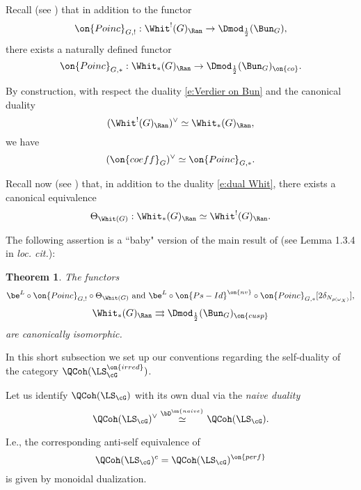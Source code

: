 \documentclass[9pt]{amsart}
\newtheorem{thm}[subsubsection]{Theorem}
\theoremstyle{remark}
\theoremstyle{definition}
\theoremstyle{remark}
\numberwithin{equation}{section}
\begin{document}
\sssec{}

Recall (see \cite[Sect. 9.5]{GLC2}) that in addition to the functor
$$\on{Poinc}_{G,!}:\Whit^!(G)_\Ran\to \Dmod_{\frac{1}{2}}(\Bun_G),$$
there exists a naturally defined functor
$$\on{Poinc}_{G,*}:\Whit_*(G)_\Ran\to \Dmod_{\frac{1}{2}}(\Bun_G)_{\on{co}}.$$

\sssec{}

By construction, with respect the duality \eqref{e:Verdier on Bun} and the canonical duality
\begin{equation} \label{e:dual Whit}
(\Whit^!(G)_\Ran)^\vee \simeq \Whit_*(G)_\Ran,
\end{equation}
we have
\begin{equation} \label{e:dual of Poinc}
(\on{coeff}_G)^\vee \simeq \on{Poinc}_{G,*}.
\end{equation} 

\sssec{}

Recall now (see \cite[Theorem 1.3.13]{GLC2}) that, in addition to the duality \eqref{e:dual Whit}, there exists a canonical
equivalence
\begin{equation} \label{e:Theta}
\Theta_{\Whit(G)}:\Whit_*(G)_\Ran\simeq \Whit^!(G)_\Ran.
\end{equation} 

\medskip

The following assertion is a ``baby" version of the main result of \cite{Lin} (see Lemma 1.3.4 in {\it loc. cit.}): 

\begin{thm} \label{t:simple Kevin}
The functors
$$\be^L\circ \on{Poinc}_{G,!}\circ \Theta_{\Whit(G)} \text{ and } \be^L\circ \on{Ps-Id}^{\on{nv}} \circ \on{Poinc}_{G,*}[2\delta_{N_{\rho(\omega_X)}}],$$
$$\Whit_*(G)_\Ran\rightrightarrows \Dmod_{\frac{1}{2}}(\Bun_G)_{\on{cusp}}$$
are canonically isomorphic.
\end{thm} 



In this short subsection we set up our conventions regarding the self-duality of the category $\QCoh(\LS^{\on{irred}}_\cG)$. 

\sssec{}

Let us identify $\QCoh(\LS_\cG)$ with its own dual via the \emph{naive duality}
\begin{equation} \label{e:naive self-dual QCoh}
\QCoh(\LS_\cG)^\vee \overset{\bD^{\on{naive}}}\simeq \QCoh(\LS_\cG).
\end{equation} 

I.e., the corresponding anti-self equivalence of 
$$\QCoh(\LS_\cG)^c=\QCoh(\LS_\cG)^{\on{perf}}$$
is given by monoidal dualization.
\end{document}
